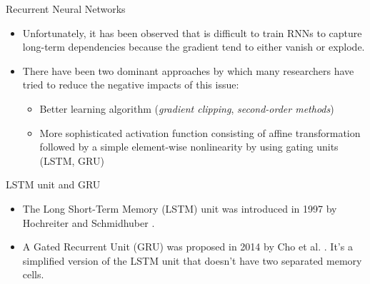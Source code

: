 \documentclass[10pt]{beamer}
\begin{document}
\begin{frame}{Recurrent Neural Networks}

\begin{itemize}
\item
Unfortunately, it has been observed that is difficult to train RNNs to capture long-term dependencies because the gradient tend to either vanish or explode.
\item
There have been two dominant approaches by which many researchers have tried to reduce the negative impacts of this issue:
\begin{itemize}
\item
Better learning algorithm (\textit{gradient clipping}, \textit{second-order methods})
\item
More sophisticated activation function consisting of affine transformation followed by a simple element-wise nonlinearity by using gating units (LSTM, GRU)
\end{itemize}
\end{itemize}

\end{frame}


\begin{frame}{LSTM unit and GRU}

\begin{itemize}
\item
The Long Short-Term Memory (LSTM) unit was introduced in 1997 by Hochreiter and Schmidhuber \cite{hochreiter1997long}.
\item
A Gated Recurrent Unit (GRU) was proposed in 2014 by Cho et al. \cite{cho2014properties}. It's a simplified version of the LSTM unit that doesn't have two separated memory cells.
\end{itemize}


\end{frame}
\end{document}
